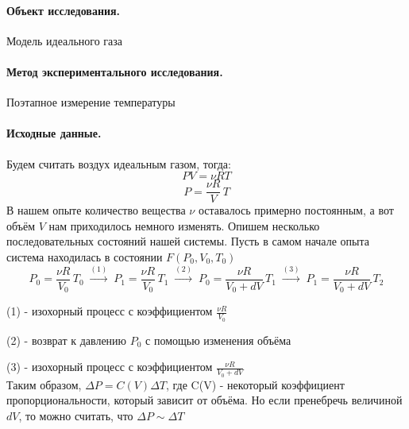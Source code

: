 \documentclass[a4paper]{article}
\begin{document}
	\paragraph{Объект исследования.} Модель идеального газа
	\paragraph{Метод экспериментального исследования.} Поэтапное измерение температуры
	\paragraph{Исходные данные.}
	Будем считать воздух идеальным газом, тогда:
	$$PV=\nu RT $$
	$$ P=\frac{\nu R}{V}\,T$$
	В нашем опыте количество вещества $\nu$ оставалось примерно постоянным, а вот объём $V$ нам приходилось немного изменять. Опишем несколько последовательных состояний нашей системы.
	Пусть в самом начале опыта система находилась в состоянии $F(P_0,V_0,T_0)$
	$$ P_0=\frac{\nu R}{V_0}\,T_0\; \xrightarrow{(1)} \; P_1=\frac{\nu R}{V_0}\,T_1 \;\xrightarrow{(2)}\; P_0=\frac{\nu R}{V_0+dV}\,T_1 \;\xrightarrow{(3)} \; P_1=\frac{\nu R}{V_0+dV}\,T_2$$
	
	(1) - изохорный процесс с коэффициентом $ \frac{\nu R}{V_0} $
	
	(2) - возврат к давлению $P_0$ с помощью изменения объёма
	
	(3) - изохорный процесс с коэффициентом $ \frac{\nu R}{V_0+dV} $\\
	
	Таким образом, $\Delta P=C(V)\Delta T$, где C(V) - некоторый коэффициент пропорциональности, который зависит от объёма. Но если пренебречь величиной $dV$, то можно считать, что $\Delta P \sim \Delta T$\\
	
\end{document}
